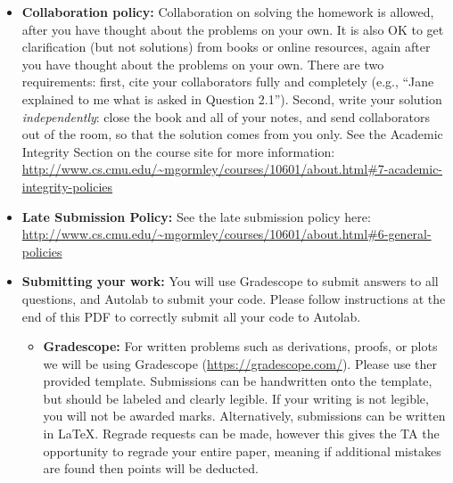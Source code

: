 \documentclass[11pt]{article}
\numberwithin{equation}{section} %
\numberwithin{figure}{section} %
\numberwithin{table}{section} %
\begin{document}
\begin{itemize}

\item \textbf{Collaboration policy:} Collaboration on solving the homework is allowed, after you have thought about the problems on your own. It is also OK to get clarification (but not solutions) from books or online resources, again after you have thought about the problems on your own. There are two requirements: first, cite your collaborators fully and completely (e.g., ``Jane explained to me what is asked in Question 2.1''). Second, write your solution {\em independently}: close the book and all of your notes, and send collaborators out of the room, so that the solution comes from you only.  See the Academic Integrity Section on the course site for more information: \url{http://www.cs.cmu.edu/~mgormley/courses/10601/about.html#7-academic-integrity-policies}

\item\textbf{Late Submission Policy:} See the late submission policy here: \url{http://www.cs.cmu.edu/~mgormley/courses/10601/about.html#6-general-policies}

\item\textbf{Submitting your work:} You will use Gradescope to submit
  answers to all questions, and Autolab to submit your code. Please
  follow instructions at the end of this PDF to correctly submit all your code to Autolab.

  \begin{itemize}
    

    
   \item \textbf{Gradescope:} For written problems such as derivations,
       proofs, or plots we will be using Gradescope
       (\url{https://gradescope.com/}). Please use ther provided template. Submissions can be handwritten onto the template, but
       should be labeled and clearly legible. If your writing is not
       legible, you will not be awarded marks. Alternatively, submissions
       can be written in LaTeX. Regrade requests can be made, however
       this gives the TA the opportunity to regrade your entire paper,
       meaning if additional mistakes are found then points will be
       deducted.


\end{itemize}
\end{itemize}
\end{document}
